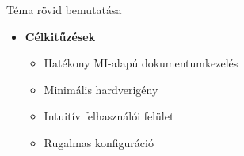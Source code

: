 \documentclass[11pt]{beamer}
\begin{document}
\begin{frame}{Téma rövid bemutatása}
\begin{itemize}
        \item \textbf{Célkitűzések}
        \begin{itemize}
            \vspace{0.5em}
            \item Hatékony MI-alapú dokumentumkezelés  
            \vspace{0.5em}
            \item Minimális hardverigény  
            \vspace{0.5em}
            \item Intuitív felhasználói felület  
            \vspace{0.5em}
            \item Rugalmas konfiguráció  
        \end{itemize}
    \end{itemize}
\end{frame}
\end{document}
